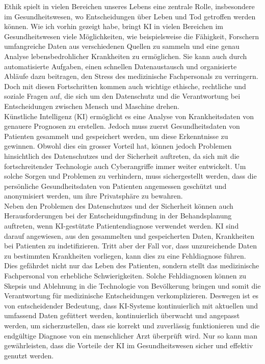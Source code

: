 \documentclass{article}
\begin{document}
Ethik spielt in vielen Bereichen unseres Lebens eine zentrale Rolle, insbesondere 
im Gesundheitswesen, wo Entscheidungen über Leben und Tod getroffen werden können. 
Wie ich vorhin gezeigt habe, bringt KI in vielen Bereichen im Gesundheitswesen viele Möglichkeiten, wie beispielsweise
die Fähigkeit, Forschern umfangreiche Daten aus verschiedenen Quellen zu sammeln und eine
genau Analyse lebensbedrohlicher Krankheiten zu ermöglichen. Sie kann auch durch automatisierte Aufgaben, einen schnellen 
Datenaustausch und organisierte Abläufe dazu beitragen, den Stress des medizinische Fachpersonals zu verringern.
Doch mit diesen Fortschritten kommen auch wichtige ethische, rechtliche und soziale 
Fragen auf, die sich um den Datenschutz und die Verantwortung bei Entscheidungen zwischen Mensch und Maschine drehen.
\\
Künstliche Intelligenz (KI) ermöglicht es eine Analyse von Krankheitsdaten von
genauere Prognosen zu erstellen. Jedoch muss zuerst Gesundheitsdaten von Patienten gesammelt und
gespeichert werden, um diese Erkenntnisse zu gewinnen. Obwohl dies ein grosser Vorteil hat, können jedoch Problemen 
hinsichtlich des Datenschutzes und der Sicherheit auftreten, da sich mit die fortschreitender Technologie auch 
Cyberangriffe immer weiter entwickelt.\citep{clutch} Um solche Sorgen und Problemen zu verhindern, muss sichergestellt werden,
dass die persönliche Gesundheitsdaten von Patienten angemessen geschützt und anonymisiert werden, um ihre Privatsphäre 
zu bewahren.
\\
Neben den Problemen des Datenschutzes und der Sicherheit können auch Herausforderungen bei der Entscheidungsfindung in der Behandsplanung auftreten, wenn KI-gestützte
Patientendiagnose verwendet werden. KI sind darauf angewiesen, aus den gesammelten und gespeicherten Daten, 
Krankheiten bei Patienten zu indetifizieren. Tritt aber der Fall vor, dass unzureichende Daten zu bestimmten Krankheiten 
vorliegen, kann dies zu eine Fehldiagnose führen. Dies gefährdet nicht nur das Leben des Patienten, sondern stellt das medizinische 
Fachpersonal von erhebliche Schwierigkeiten. Solche Fehldiagnosen können zu Skepsis und Ablehnung in die Technologie von Bevölkerung bringen
und somit die Verantwortung für medizinische Entscheidungen verkomplizieren. Deswegen ist es von entscheidender Bedeutung, 
dass KI-Systeme kontinuierlich mit aktuellen und umfassend Daten gefüttert werden, kontinuierlich überwacht und angepasst werden, um sicherzustellen, dass sie korrekt und zuverlässig funktionieren
und die endgültige Diagnose von ein menschlicher Arzt überprüft wird. Nur so kann man gewährleisten, dass die Vorteile
der KI im Gesundheitswesen sicher und effektiv genutzt werden. 
\end{document}
